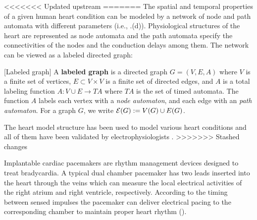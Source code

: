 %
<<<<<<< Updated upstream
=======
The spatial and temporal properties of a given human heart condition can be modeled by a network of node and path automata with different parameters (i.e., .(d)). Physiological structures of the heart are represented as node automata and the path automata specify the connectivities of the nodes and the conduction delays among them. 
The network can be viewed as a labeled directed graph: %
\begin{defn}
	\label{def:labeledGraph}
	[Labeled graph]
	A \textbf{labeled graph} is a directed graph $G = (V,E,A)$ where 
	$V$ is a finite set of vertices, $E \subset V\times V$ is a finite set of directed edges,
	and $A$ is a total labeling function $A: V \cup E \rightarrow TA$
	where $TA$ is the set of timed automata.
	The function $A$ labels each vertex with a \emph{node automaton}, and each edge with an \emph{path automaton}.
	For a graph $G$, we write $\mathcal{E}(G) := V(G) \cup E(G)$.
\end{defn}
The heart model structure has been used to model various heart conditions and all of them have been validated by electrophysiologists \cite{vhm_ecrts10}.
>>>>>>> Stashed changes

Implantable cardiac pacemakers are rhythm management devices designed to treat bradycardia. 
A typical dual chamber pacemaker has two leads inserted into the heart through the veins which can measure the local electrical activities of the right atrium and right ventricle, respectively. According to the timing between sensed impulses the pacemaker can deliver electrical pacing to the corresponding chamber to maintain proper heart rhythm ().  

